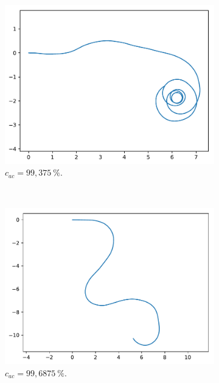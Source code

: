 \begin{appendices}
\begin{figure}[htb]
\begin{subfigure}[t]{\subImgWarea}
			\centering
			\includegraphics[width=\textwidth]{figures/ch3/2_19_autocorr_2_19_180_32_0_99375}
			\caption{$c_{ac} = 99,375~\%$.}
			\label{fig:2_19_autocorr_2_19_180_32_0_99375}
		\end{subfigure}
		~
		\begin{subfigure}[t]{\subImgWarea}
			\centering
			\includegraphics[width=\textwidth]{figures/ch3/2_19_autocorr_2_19_180_32_0_996875}
			\caption{$c_{ac} = 99,6875~\%$.}
			\label{fig:2_19_autocorr_2_19_180_32_0_996875}
		\end{subfigure}
		~
		\begin{subfigure}[t]{\subImgWarea}
			\centering

\end{subfigure}
\end{figure}
\end{appendices}
